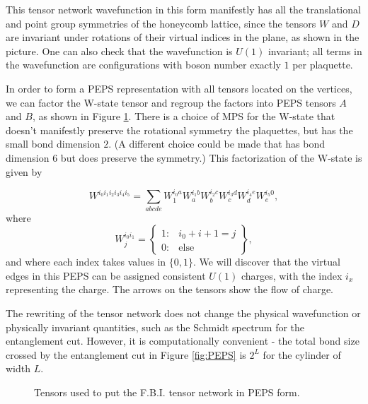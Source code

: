 This tensor network wavefunction in this form manifestly has all the translational and point group symmetries of the honeycomb lattice, since the tensors $W$ and $D$ are invariant under rotations of their virtual indices in the plane, as shown in the picture. One can also check that the wavefunction is $U(1)$ invariant; all terms in the wavefunction are configurations with boson number exactly $1$ per plaquette.

In order to form a PEPS representation with all tensors located on the vertices, we can factor the W-state tensor and regroup the factors into PEPS tensors $A$ and $B$, as shown in Figure \ref{fig:FBI_PEPS_2}. 
There is a choice of MPS for the W-state that doesn't manifestly preserve the rotational symmetry the plaquettes, but has the small bond dimension $2$. (A different choice could be made that has bond dimension 6 but does preserve the symmetry.) This factorization of the W-state is given by

$$
W^{i_0 i_1 i_2 i_3 i_4 i_5} = \sum\limits_{abcde} W^{i_0 a}_{1} W^{i_1 b}_{a} W^{i_2 c}_{b} W^{i_3 d}_{c} W^{i_4 e}_{d} W^{i_5 0}_{e},
$$
where 
$$ W^{i_0 i_1}_{j}  = \left\{ \begin{array}{lr}
													1  : & i_0+i+1 = j \\
													0  : & \text{else}
													\end{array}
											\right\},
$$
and where each index takes values in $\{0, 1\}$. We will discover that the virtual edges in this PEPS can be assigned consistent $U(1)$ charges, with the index $i_x$ representing the charge. The arrows on the tensors show the flow of charge.

The rewriting of the tensor network does not change the physical wavefunction or physically invariant quantities, such as the Schmidt spectrum for the entanglement cut. However, it is computationally convenient - the total bond size crossed by the entanglement cut in Figure \ref{fig:PEPS} is $2^L$ for the cylinder of width $L$.

\begin{figure}[H]
	\centering
	\quad
		
%
\caption{ Tensors used to put the F.B.I. tensor network in PEPS form. }
\label{fig:FBI_PEPS_2}
\end{figure}

